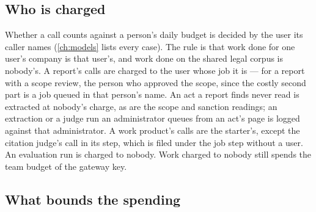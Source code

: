 \subsection{Who is charged}

Whether a call counts against a person's daily budget is decided by the user its caller
names (\cref{ch:models} lists every case). The rule is that work done for one user's company is
that user's, and work done on the shared legal corpus is nobody's. A report's calls are
charged to the user whose job it is --- for a report with a scope review, the person who
approved the scope, since the costly second part is a job queued in that person's name. An
act a report finds never read is extracted at nobody's charge, as are the scope and sanction
readings; an extraction or a judge run an administrator queues from an act's page is logged
against that administrator. A work product's calls are the starter's, except the citation
judge's call in its  step, which is filed under the job step without a user.
An evaluation run is charged to nobody. Work charged to nobody still spends the team budget of
the gateway key.

\subsection{What bounds the spending}

